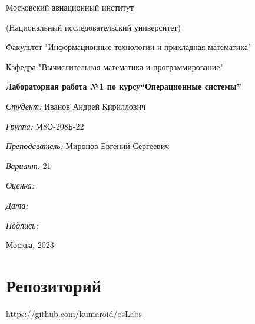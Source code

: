 \documentclass[a4paper, 12pt]{article}
\begin{document}
\thispagestyle{empty}	
\begin{center}
	Московский авиационный институт
	
	(Национальный исследовательский университет)
	
	Факультет "Информационные технологии и прикладная математика"
	
	Кафедра "Вычислительная математика и программирование"
	
\end{center}
\vspace{40ex}
\begin{center}
	\textbf{\large{Лабораторная работа №1 по курсу\linebreak \textquotedblleft Операционные системы\textquotedblright}}
\end{center}
\vspace{35ex}
\begin{flushright}
	\textit{Студент: } Иванов Андрей Кириллович
	
	\vspace{2ex}
	\textit{Группа: } М8О-208Б-22
	
	\vspace{2ex}
	\textit{Преподаватель: } Миронов Евгений Сергеевич
	
	\vspace{2ex}
	\textit{Вариант: } 21
	
	\vspace{2ex}
	\textit{Оценка: } \underline{\quad\quad\quad\quad\quad\quad}
	
	 \vspace{2ex}
	\textit{Дата: } \underline{\quad\quad\quad\quad\quad\quad}
	
	\vspace{2ex}
	\textit{Подпись: } \underline{\quad\quad\quad\quad\quad\quad}
	
\end{flushright}

\vspace{5ex}

\begin{vfill}
	\begin{center}
		Москва, 2023
	\end{center}	
\end{vfill}
\newpage


\begingroup
\color{black}
\tableofcontents\newpage
\endgroup

\section{Репозиторий}
\href{https://github.com/kumaroid/osLabs}{https://github.com/kumaroid/osLabs}
\end{document}
